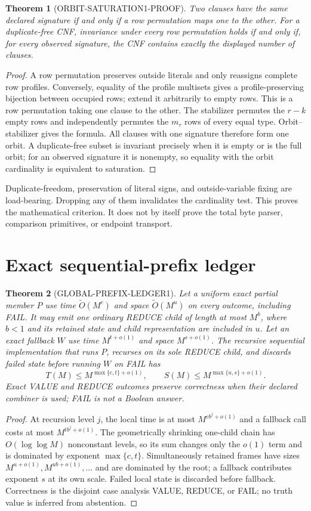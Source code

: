 \documentclass[11pt]{article}
\newtheorem{theorem}{Theorem}
\newcommand{\softO}{\widetilde O}
\begin{document}
\begin{theorem}[ORBIT-SATURATION1-PROOF]
Two clauses have the same declared signature if and only if a row
permutation maps one to the other.  For a duplicate-free CNF, invariance
under every row permutation holds if and only if, for every observed
signature, the CNF contains exactly the displayed number of clauses.
\end{theorem}
\begin{proof}
A row permutation preserves outside literals and only reassigns complete row
profiles.  Conversely, equality of the profile multisets gives a
profile-preserving bijection between occupied rows; extend it arbitrarily to
empty rows.  This is a row permutation taking one clause to the other.  The
stabilizer permutes the $r-k$ empty rows and independently permutes the
$m_\tau$ rows of every equal type.  Orbit--stabilizer gives the formula.
All clauses with one signature therefore form one orbit.  A duplicate-free
subset is invariant precisely when it is empty or is the full orbit; for an
observed signature it is nonempty, so equality with the orbit cardinality is
equivalent to saturation.
\end{proof}

Duplicate-freedom, preservation of literal signs, and outside-variable
fixing are load-bearing.  Dropping any of them invalidates the cardinality
test.  This proves the mathematical criterion.  It does not by itself prove
the total byte parser, comparison primitives, or endpoint transport.

\section{Exact sequential-prefix ledger}
\begin{theorem}[GLOBAL-PREFIX-LEDGER1]
Let a uniform exact partial member $P$ use time $\softO(M^c)$ and space
$\softO(M^u)$ on every outcome, including FAIL.  It may emit one ordinary
REDUCE child of length at most $M^b$, where $b<1$ and its retained
state and child representation are included in $u$.  Let an exact fallback
$W$ use time $M^{t+o(1)}$ and space $M^{s+o(1)}$.  The recursive sequential
implementation that runs $P$, recurses on its sole REDUCE child, and discards
failed state before running $W$ on FAIL has
\[
 T(M)\le M^{\max\{c,t\}+o(1)},\qquad
 S(M)\le M^{\max\{u,s\}+o(1)}.
\]
Exact VALUE and REDUCE outcomes preserve correctness when their declared
combiner is used; FAIL is not a Boolean answer.
\end{theorem}
\begin{proof}
At recursion level $j$, the local time is at most
$M^{cb^j+o(1)}$ and a fallback call costs at most
$M^{tb^j+o(1)}$.  The geometrically shrinking one-child chain has
$O(\log\log M)$ nonconstant levels, so its sum changes only the $o(1)$ term
and is dominated by exponent $\max\{c,t\}$.  Simultaneously retained frames
have sizes $M^{u+o(1)},M^{ub+o(1)},\ldots$ and are dominated by the root;
a fallback contributes exponent $s$ at its own scale.  Failed local state is
discarded before fallback.  Correctness is the disjoint case analysis VALUE,
REDUCE, or FAIL; no truth value is inferred from abstention.
\end{proof}
\end{document}
